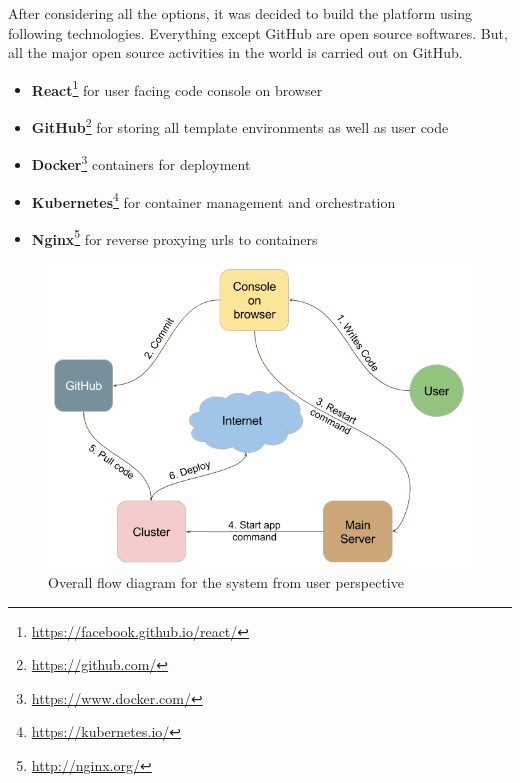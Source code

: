 \documentclass[DD]{iitmdiss}
\begin{document}

After considering all the options, it was decided to build the platform using following technologies. Everything except GitHub are open source softwares. But, all the major open source activities in the world is carried out on GitHub.
\begin{itemize}
	\item \textbf{React}\footnote{\url{https://facebook.github.io/react/}} for user facing code console on browser
	\item \textbf{GitHub}\footnote{\label{github_website}\url{https://github.com/}} for storing all template environments as well as user code
	\item \textbf{Docker}\footnote{\url{https://www.docker.com/}} containers for deployment
	\item \textbf{Kubernetes}\footnote{\url{https://kubernetes.io/}} for container management and orchestration
	\item \textbf{Nginx}\footnote{\url{http://nginx.org/}} for reverse proxying urls to containers
\end{itemize}

\begin{figure}
	\centering
	\includegraphics[width=0.9\linewidth]{img/user_flow}
	\caption[Overall flow diagram for the system]{Overall flow diagram for the system from user perspective}
	\label{fig:userflow}
\end{figure}
\end{document}
